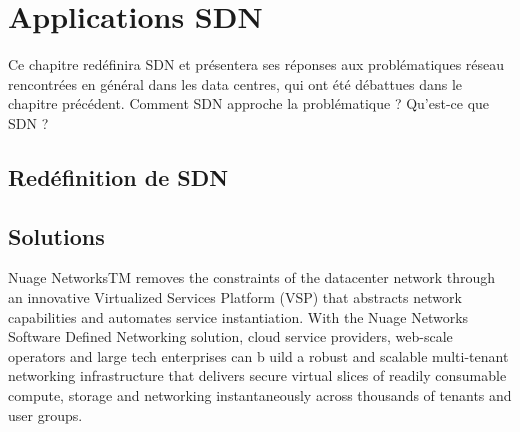 
\chapter{Applications SDN}

Ce chapitre redéfinira SDN et présentera ses réponses aux problématiques réseau rencontrées en général dans les data centres, qui ont été débattues dans le chapitre précédent. Comment SDN approche la problématique ? Qu'est-ce que SDN ?

\section{Redéfinition de SDN}

\section{Solutions}

Nuage NetworksTM removes the constraints of the datacenter network through an innovative Virtualized Services Platform (VSP) that abstracts network capabilities and automates service instantiation. With the Nuage Networks Software Defined Networking solution, cloud service providers, web-scale operators and large tech enterprises can b uild a robust and scalable multi-tenant networking infrastructure that delivers secure virtual slices of readily consumable compute, storage and networking instantaneously across thousands of tenants and user groups.


